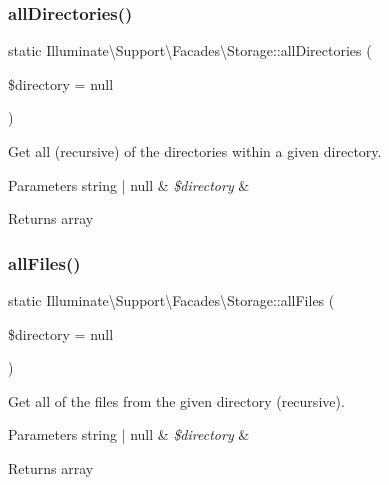 \subsubsection{\texorpdfstring{all\+Directories()}{allDirectories()}}
{\footnotesize\ttfamily static Illuminate\textbackslash{}\+Support\textbackslash{}\+Facades\textbackslash{}\+Storage\+::all\+Directories (\begin{DoxyParamCaption}\item[{}]{\$directory = {\ttfamily null} }\end{DoxyParamCaption})\hspace{0.3cm}{\ttfamily [static]}}

Get all (recursive) of the directories within a given directory.


\begin{DoxyParams}[1]{Parameters}
string | null & {\em \$directory} & \\
\hline
\end{DoxyParams}
\begin{DoxyReturn}{Returns}
array 
\end{DoxyReturn}
\mbox{\label{class_illuminate_1_1_support_1_1_facades_1_1_storage_af9426d2b2b4d3c92f9dd4417b93ed54b}} 
\subsubsection{\texorpdfstring{all\+Files()}{allFiles()}}
{\footnotesize\ttfamily static Illuminate\textbackslash{}\+Support\textbackslash{}\+Facades\textbackslash{}\+Storage\+::all\+Files (\begin{DoxyParamCaption}\item[{}]{\$directory = {\ttfamily null} }\end{DoxyParamCaption})\hspace{0.3cm}{\ttfamily [static]}}

Get all of the files from the given directory (recursive).


\begin{DoxyParams}[1]{Parameters}
string | null & {\em \$directory} & \\
\hline
\end{DoxyParams}
\begin{DoxyReturn}{Returns}
array 
\end{DoxyReturn}
\mbox{\label{class_illuminate_1_1_support_1_1_facades_1_1_storage_a9ff621399c8b9c27793d036b897cf04e}} 

